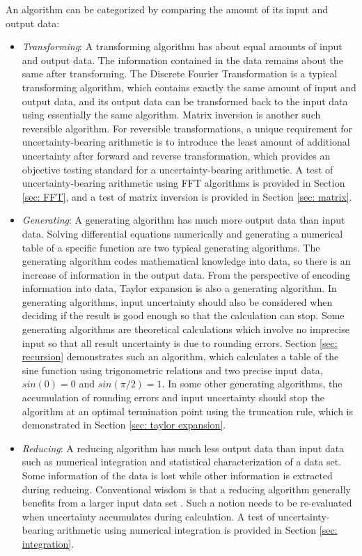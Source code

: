 \documentclass[twoside]{article}
\numberwithin{equation}{section}
\begin{document}
An algorithm can be categorized by comparing the amount of its input and output data:
\begin{itemize}
\item \emph{Transforming}: 
A transforming algorithm has about equal amounts of input and output data.  
The information contained in the data remains about the same after transforming.  
The Discrete Fourier Transformation is a typical transforming algorithm, which contains exactly the same amount of input and output data, and its output data can be transformed back to the input data using essentially the same algorithm.  
Matrix inversion is another such reversible algorithm.  
For reversible transformations, a unique requirement for uncertainty-bearing arithmetic is to introduce the least amount of additional uncertainty after forward and reverse transformation, which provides an objective testing standard for a uncertainty-bearing arithmetic.  
A test of uncertainty-bearing arithmetic using FFT algorithms is provided in Section \ref{sec: FFT}, and a test of matrix inversion is provided in Section \ref{sec: matrix}.

\item \emph{Generating}:  
A generating algorithm has much more output data than input data.  
Solving differential equations numerically and generating a numerical table of a specific function are two typical generating algorithms.  
The generating algorithm codes mathematical knowledge into data, so there is an increase of information in the output data.  
From the perspective of encoding information into data, Taylor expansion is also a generating algorithm. 
In generating algorithms, input uncertainty should also be considered when deciding if the result is good enough so that the calculation can stop.  
Some generating algorithms are theoretical calculations which involve no imprecise input so that all result uncertainty is due to rounding errors.  
Section \ref{sec: recursion} demonstrates such an algorithm, which calculates a table of the sine function using trigonometric relations and two precise input data, $sin(0)=0$ and $sin(\pi/2)=1$.  
In some other generating algorithms, the accumulation of rounding errors and input uncertainty should stop the algorithm at an optimal termination point using the truncation rule, which is demonstrated in Section \ref{sec: taylor expansion}.

\item \emph{Reducing}:  
A reducing algorithm has much less output data than input data such as numerical integration and statistical characterization of a data set.  
Some information of the data is lost while other information is extracted during reducing.  
Conventional wisdom is that a reducing algorithm generally benefits from a larger input data set \cite{Probability_Statistics}.  
Such a notion needs to be re-evaluated when uncertainty accumulates during calculation.  
A test of uncertainty-bearing arithmetic using numerical integration is provided in Section \ref{sec: integration}.

\end{itemize}
\end{document}

